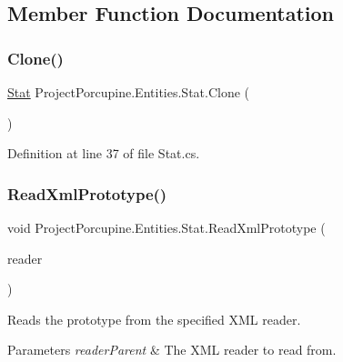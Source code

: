 \subsection{Member Function Documentation}
\mbox{\label{class_project_porcupine_1_1_entities_1_1_stat_a4c3fcc624774080c6a5f5c2a2db213da}} 
\subsubsection{\texorpdfstring{Clone()}{Clone()}}
{\footnotesize\ttfamily \hyperlink{class_project_porcupine_1_1_entities_1_1_stat}{Stat} Project\+Porcupine.\+Entities.\+Stat.\+Clone (\begin{DoxyParamCaption}{ }\end{DoxyParamCaption})}



Definition at line 37 of file Stat.\+cs.

\mbox{\label{class_project_porcupine_1_1_entities_1_1_stat_a420448593510dc5ef1931cc099dbf164}} 
\subsubsection{\texorpdfstring{Read\+Xml\+Prototype()}{ReadXmlPrototype()}}
{\footnotesize\ttfamily void Project\+Porcupine.\+Entities.\+Stat.\+Read\+Xml\+Prototype (\begin{DoxyParamCaption}\item[{Xml\+Reader}]{reader }\end{DoxyParamCaption})}



Reads the prototype from the specified X\+ML reader. 


\begin{DoxyParams}{Parameters}
{\em reader\+Parent} & The X\+ML reader to read from.\\
\hline
\end{DoxyParams}


